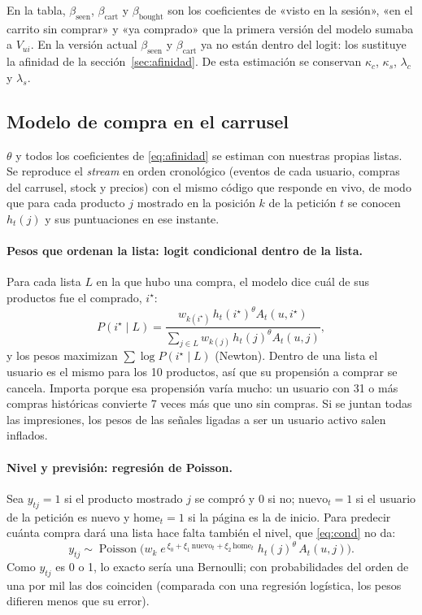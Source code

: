 \documentclass[11pt,a4paper]{article}
\newcommand{\Poi}{\operatorname{Poisson}}
\begin{document}
En la tabla, $\beta_{\text{seen}}$, $\beta_{\text{cart}}$ y $\beta_{\text{bought}}$ son los coeficientes de «visto
en la sesión», «en el carrito sin comprar» y «ya comprado» que la primera versión del modelo sumaba a
$V_{ui}$. En la versión actual $\beta_{\text{seen}}$ y $\beta_{\text{cart}}$ ya no están dentro del logit: los
sustituye la afinidad de la sección~\ref{sec:afinidad}. De esta estimación se conservan $\kappa_c$,
$\kappa_s$, $\lambda_c$ y $\lambda_s$.

\subsection{Modelo de compra en el carrusel}\label{sec:poisson}

$\theta$ y todos los coeficientes de \eqref{eq:afinidad} se estiman con nuestras propias listas. Se
reproduce el \emph{stream} en orden cronológico (eventos de cada usuario, compras del carrusel, stock y
precios) con el mismo código que responde en vivo, de modo que para cada producto $j$ mostrado en la
posición $k$ de la petición $t$ se conocen $h_t(j)$ y sus puntuaciones en ese instante.

\paragraph{Pesos que ordenan la lista: logit condicional dentro de la lista.} Para cada lista $L$ en la que
hubo una compra, el modelo dice cuál de sus productos fue el comprado, $i^\star$:
\begin{equation}
P(i^\star\mid L)=\frac{w_{k(i^\star)}\,h_t(i^\star)^{\theta}A_t(u,i^\star)}{\sum_{j\in L}w_{k(j)}\,h_t(j)^{\theta}A_t(u,j)} ,
\label{eq:cond}
\end{equation}
y los pesos maximizan $\sum\log P(i^\star\mid L)$ (Newton). Dentro de una lista el usuario es el mismo para
los 10 productos, así que su propensión a comprar se cancela. Importa porque esa propensión varía mucho:
un usuario con 31 o más compras históricas convierte 7 veces más que uno sin compras. Si se juntan todas
las impresiones, los pesos de las señales ligadas a ser un usuario activo salen inflados.

\paragraph{Nivel y previsión: regresión de Poisson.} Sea $y_{tj}=1$ si el producto mostrado $j$ se compró
y $0$ si no; $\text{nuevo}_t=1$ si el usuario de la petición es nuevo y $\text{home}_t=1$ si la página es
la de inicio. Para predecir cuánta compra dará una lista hace falta también el nivel, que
\eqref{eq:cond} no da:
\begin{equation}
y_{tj}\sim\Poi\Big(w_k\;e^{\,\xi_0+\xi_1\,\text{nuevo}_t+\xi_2\,\text{home}_t}\;h_t(j)^{\theta}\,A_t(u,j)\Big).
\label{eq:poisson}
\end{equation}
Como $y_{tj}$ es 0 o 1, lo exacto sería una Bernoulli; con probabilidades del orden de una por mil las dos
coinciden (comparada con una regresión logística, los pesos difieren menos que su error).
\end{document}
